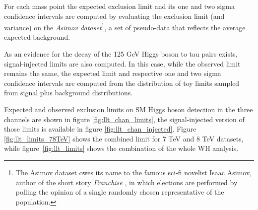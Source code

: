 For each mass point the expected exclusion limit and its one and two sigma confidence intervals are computed  by evaluating the exclusion limit (and variance) on the \emph{Asimov dataset}\footnote{The Asimov dataset owes its name to the famous sci-fi novelist Isaac Asimov, author of the short story \emph{Franchise} \cite{franchise}, in which elections are performed by polling the opinion of a single randomly chosen representative of the population.}, a set of pseudo-data that reflects the average expected background. 

{\color{red}
As an evidence for the decay of the 125 GeV Higgs boson to tau pairs exists, signal-injected limits are also computed. In this case, while the observed limit remains the same, the expected limit and respective one and two sigma confidence intervals are computed from the distribution of toy limits sampled from signal plus background distributions.
}

Expected and observed exclusion limits on SM Higgs boson detection in the three channels are shown in figure \ref{fig:llt_chan_limits}, the signal-injected version of those limits is available in figure \ref{fig:llt_chan_injected}. Figure \ref{fig:llt_limits_78TeV} shows the combined limit for 7 TeV and 8 TeV datasets, while figure~\ref{fig:llt_limits} shows the combination of the whole WH analysis.

